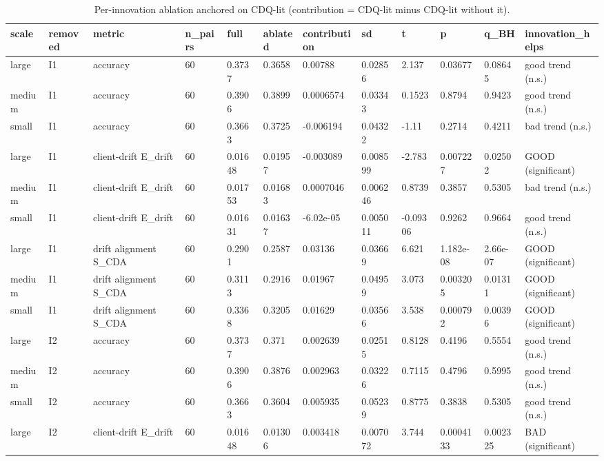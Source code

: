 \begin{table}[t]\centering\footnotesize
\caption{Per-innovation ablation anchored on CDQ-lit (contribution = CDQ-lit minus CDQ-lit without it).}\label{tab:table10_innovation_ablation_lit}
\begin{tabular}{llllllllllll}
\toprule
scale & removed & metric & n\_pairs & full & ablated & contribution & sd & t & p & q\_BH & innovation\_helps \\
\midrule
large & I1 & accuracy & 60 & 0.3737 & 0.3658 & 0.00788 & 0.02856 & 2.137 & 0.03677 & 0.08645 & good trend (n.s.) \\
medium & I1 & accuracy & 60 & 0.3906 & 0.3899 & 0.0006574 & 0.03343 & 0.1523 & 0.8794 & 0.9423 & good trend (n.s.) \\
small & I1 & accuracy & 60 & 0.3663 & 0.3725 & -0.006194 & 0.04322 & -1.11 & 0.2714 & 0.4211 & bad trend (n.s.) \\
large & I1 & client-drift E\_drift & 60 & 0.01648 & 0.01957 & -0.003089 & 0.008599 & -2.783 & 0.007227 & 0.02502 & GOOD (significant) \\
medium & I1 & client-drift E\_drift & 60 & 0.01753 & 0.01683 & 0.0007046 & 0.006246 & 0.8739 & 0.3857 & 0.5305 & bad trend (n.s.) \\
small & I1 & client-drift E\_drift & 60 & 0.01631 & 0.01637 & -6.02e-05 & 0.005011 & -0.09306 & 0.9262 & 0.9664 & good trend (n.s.) \\
large & I1 & drift alignment S\_CDA & 60 & 0.2901 & 0.2587 & 0.03136 & 0.03669 & 6.621 & 1.182e-08 & 2.66e-07 & GOOD (significant) \\
medium & I1 & drift alignment S\_CDA & 60 & 0.3113 & 0.2916 & 0.01967 & 0.04959 & 3.073 & 0.003205 & 0.01311 & GOOD (significant) \\
small & I1 & drift alignment S\_CDA & 60 & 0.3368 & 0.3205 & 0.01629 & 0.03566 & 3.538 & 0.000792 & 0.00396 & GOOD (significant) \\
large & I2 & accuracy & 60 & 0.3737 & 0.371 & 0.002639 & 0.02515 & 0.8128 & 0.4196 & 0.5554 & good trend (n.s.) \\
medium & I2 & accuracy & 60 & 0.3906 & 0.3876 & 0.002963 & 0.03226 & 0.7115 & 0.4796 & 0.5995 & good trend (n.s.) \\
small & I2 & accuracy & 60 & 0.3663 & 0.3604 & 0.005935 & 0.05239 & 0.8775 & 0.3838 & 0.5305 & good trend (n.s.) \\
large & I2 & client-drift E\_drift & 60 & 0.01648 & 0.01306 & 0.003418 & 0.007072 & 3.744 & 0.0004133 & 0.002325 & BAD (significant) \\

\end{tabular}
\end{table}
